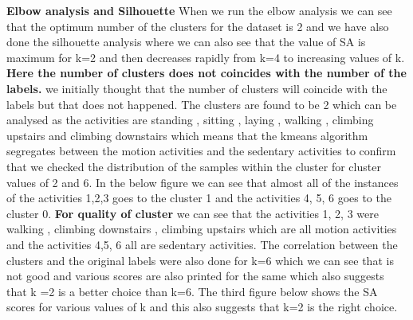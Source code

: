 \documentclass[a4paper,12pt]{article}
\begin{document}
\textbf{ Elbow analysis and Silhouette } When we run the elbow analysis we can see that the optimum number of the clusters for the dataset is 2 and we have also done the silhouette analysis where we  can also see that the value of SA is maximum for k=2 and then decreases rapidly from k=4 to increasing values of k. \textbf{Here the number of clusters does not coincides with the number of the labels.} we initially thought that the number of clusters will coincide with the labels but that does not happened. The clusters are found to be 2 which can be analysed as the activities are standing , sitting , laying , walking , climbing upstairs and climbing downstairs which means that the kmeans algorithm segregates between the motion activities and the sedentary activities to confirm that we checked the distribution of the samples within the cluster  for cluster values of 2 and 6. In the below figure we can see that almost all of the instances of the activities 1,2,3 goes to the cluster 1 and the activities 4, 5, 6 goes to the cluster 0.  \textbf{ For quality of cluster } we can see that the activities 1, 2, 3 were walking , climbing downstairs , climbing upstairs which are all motion activities and the activities 4,5, 6 all are sedentary activities. The correlation between the clusters and the original labels were also done for k=6 which we can see that is not good and various scores are also printed for the same which also suggests that k =2 is a better choice than k=6. The third figure below shows the SA scores for various values of k and this also suggests that k=2 is the right choice. \newline 
\end{document}
